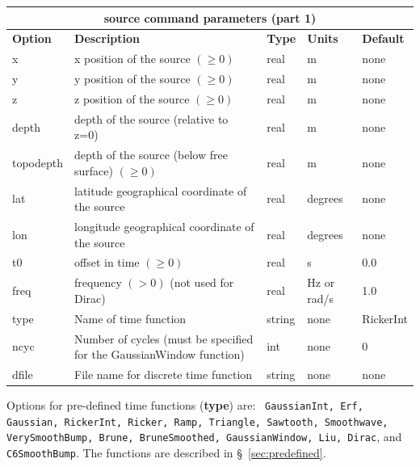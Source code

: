\documentclass[11pt]{report}
\begin{document}
%
\begin{center}
\begin{tabular}{|l|p{8cm}|l|l|l|} \hline
\multicolumn{5}{|c|}{\bf source command parameters (part 1)}\\ \hline
\bf{Option} & \bf{Description} & \bf{Type} & \bf{Units} & \bf{Default} \\ \hline \hline
x & x position of the source $(\geq 0)$ & real & m & none \\ \hline
y & y position of the source $(\geq 0)$ & real & m & none \\ \hline
z & z position of the source $(\geq 0)$ & real & m & none \\ \hline
\hline
depth & depth of the source (relative to z=0) & real & m & none \\ \hline
topodepth & depth of the source (below free surface) $(\geq 0)$ & real & m & none \\ \hline
lat & latitude geographical coordinate of the source & real & degrees & none \\ \hline
lon & longitude geographical coordinate of the source & real & degrees & none \\ \hline
\hline
t0 & offset in time $(\geq 0)$ & real & s & 0.0 \\ \hline
freq & frequency $(>0)$ (not used for Dirac)& real & Hz or rad/s & 1.0 \\ \hline
type & Name of time function & string & none & RickerInt \\ \hline
ncyc & Number of cycles (must be specified for the GaussianWindow function) & int & none & 0
\\ \hline
dfile & File name for discrete time function & string & none & none \\ \hline
\end{tabular}
\end{center}
  Options for pre-defined time functions ({\bf type}) are: {\tt
  GaussianInt, Erf, Gaussian, RickerInt, Ricker, Ramp, Triangle, Sawtooth, Smoothwave,
  VerySmoothBump, Brune, BruneSmoothed, GaussianWindow, Liu, Dirac}, and {\tt C6SmoothBump}. The
functions are described in \S~\ref{sec:predefined}.  
\end{document}
